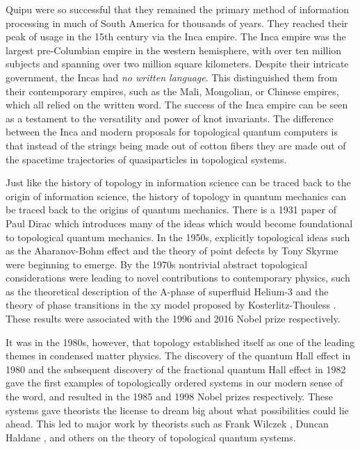 Quipu were so successful that they remained the primary method of information processing in much of South America for thousands of years. They reached their peak of usage in the 15th century via the Inca empire. The Inca empire was the largest pre-Columbian empire in the western hemisphere, with over ten million subjects and spanning over two million square kilometers. Despite their intricate government, the Incas had \textit{no written language}. This distinguished them from their contemporary empires, such as the Mali, Mongolian, or Chinese empires, which all relied on the written word. The success of the Inca empire can be seen as a testament to the versatility and power of knot invariants. The difference between the Inca and modern proposals for topological quantum computers is that instead of the strings being made out of cotton fibers they are made out of the spacetime trajectories of quasiparticles in topological systems.

Just like the history of topology in information science can be traced back to the origin of information science, the history of topology in quantum mechanics can be traced back to the origins of quantum mechanics. There is a 1931 paper of Paul Dirac \cite{dirac1931quantised} which introduces many of the ideas which would become foundational to topological quantum mechanics. In the 1950s, explicitly topological ideas such as the Aharanov-Bohm effect \cite{aharonov1959significance} and the theory of point defects by Tony Skyrme \cite{skyrme1962unified} were beginning to emerge. By the 1970s nontrivial abstract topological considerations were leading to novel contributions to contemporary physics, such as the theoretical description of the A-phase of superfluid Helium-3 \cite{anderson1977phase} and the theory of phase transitions in the xy model proposed by Kosterlitz-Thouless \cite{kosterlitz1973ordering}. These results were associated with the 1996 and 2016 Nobel prize respectively.

It was in the 1980s, however, that topology established itself as one of the leading themes in condensed matter physics. The discovery of the quantum Hall effect in 1980 \cite{klitzing1980new} and the subsequent discovery of the fractional quantum Hall effect in 1982 \cite{tsui1982two} gave the first examples of topologically ordered systems in our modern sense of the word, and resulted in the 1985 and 1998 Nobel prizes respectively. These systems gave theorists the license to dream big about what possibilities could lie ahead. This led to major work by theorists such as Frank Wilczek \cite{wilczek1982quantum, arovas1985statistical}, Duncan Haldane \cite{haldane1983nonlinear, haldane1988model}, and others on the theory of topological quantum systems.

